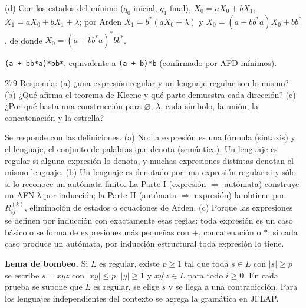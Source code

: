 \documentclass[11pt]{article}
\begin{document}
(d) Con los estados del mínimo ($q_0$ inicial, $q_1$ final), $X_0 = aX_0 + bX_1$, $X_1 = aX_0 + bX_1 + \lambda$; por Arden $X_1 = b^*(aX_0 + \lambda)$ y $X_0 = (a + bb^*a)X_0 + bb^*$, de donde $X_0 = (a + bb^*a)^*bb^*$.

\resp \texttt{(a + bb*a)*bb*}, equivalente a \texttt{(a + b)*b} (confirmado por AFD mínimos).


\begin{ejercicio}{279}{}
Responda: (a) ¿una expresión regular y un lenguaje regular son lo mismo? (b) ¿Qué afirma el teorema de Kleene y qué parte demuestra cada dirección? (c) ¿Por qué basta una construcción para $\varnothing$, $\lambda$, cada símbolo, la unión, la concatenación y la estrella?
\end{ejercicio}
\proc Se responde con las definiciones.
\resp (a) No: la expresión es una fórmula (sintaxis) y el lenguaje, el conjunto de palabras que denota (semántica). Un lenguaje es regular si alguna expresión lo denota, y muchas expresiones distintas denotan el mismo lenguaje. (b) Un lenguaje es denotado por una expresión regular si y sólo si lo reconoce un autómata finito. La Parte I (expresión $\Rightarrow$ autómata) construye un AFN-λ por inducción; la Parte II (autómata $\Rightarrow$ expresión) la obtiene por $R_{ij}^{(k)}$, eliminación de estados o ecuaciones de Arden. (c) Porque las expresiones se definen por inducción con exactamente esas reglas: toda expresión es un caso básico o se forma de expresiones más pequeñas con $+$, concatenación o $*$; si cada caso produce un autómata, por inducción estructural toda expresión lo tiene.


\textbf{Lema de bombeo.} Si $L$ es regular, existe $p \ge 1$ tal que toda $s \in L$ con $|s| \ge p$ se escribe $s = xyz$ con $|xy| \le p$, $|y| \ge 1$ y $xy^iz \in L$ para todo $i \ge 0$. En cada prueba se supone que $L$ es regular, se elige $s$ y se llega a una contradicción. Para los lenguajes independientes del contexto se agrega la gramática en JFLAP.
\end{document}
